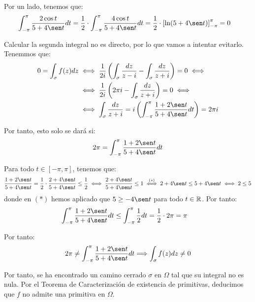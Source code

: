 \begin{ejercicio}
    Por un lado, tenemos que:
    \begin{align*}
        \int_{-\pi}^{\pi} \frac{2\cos t}{{5+4\sen t}}dt
        &= \dfrac{1}{2}\cdot \int_{-\pi}^{\pi} \frac{4\cos t}{{5+4\sen t}}dt
        = \dfrac{1}{2}\cdot \left[\ln(5+4\sen t)\right]_{-\pi}^{\pi}
        = 0
    \end{align*}

    Calcular la segunda integral no es directo, por lo que vamos a intentar evitarlo. Tenemmos que:
    \begin{align*}
        0 = \int_{\sigma} f(z)dz &\iff  \dfrac{1}{2i}\left(\int_{\sigma} \frac{dz}{z-i} - \int_{\sigma} \frac{dz}{z+i}\right) = 0\iff
        \\&\iff \dfrac{1}{2i}\left(2\pi i-\int_{\sigma} \frac{dz}{z+i}\right) = 0\iff
        \\&\iff \int_{\sigma} \frac{dz}{z+i} = i\left(\int_{-\pi}^{\pi} \frac{1+2\sen t}{{5+4\sen t}}dt\right) = 2\pi i
    \end{align*}

    Por tanto, esto solo se dará si:
    \begin{equation*}
        2\pi = \int_{-\pi}^{\pi} \frac{1+2\sen t}{{5+4\sen t}}dt
    \end{equation*}

    Para todo $t \in [-\pi,\pi]$, tenemos que:
    \begin{align*}
        \frac{1+2\sen t}{{5+4\sen t}}=\dfrac{1}{2}\cdot \frac{2+4\sen t}{{5+4\sen t}}\leq \dfrac{1}{2}
        \iff \frac{2+4\sen t}{{5+4\sen t}}\leq 1\stackrel{(\ast)}{\iff} 2+4\sen t\leq 5+4\sen t\iff 2\leq 5
    \end{align*}
    donde en $(\ast)$ hemos aplicado que $5\geq -4\sen t$ para todo $t \in \mathbb{R}$.
    Por tanto:
    \begin{align*}
        \int_{-\pi}^{\pi} \frac{1+2\sen t}{{5+4\sen t}}dt &\leq \int_{-\pi}^{\pi} \frac{1}{2}dt
        = \dfrac{1}{2}\cdot 2\pi = \pi
    \end{align*}

    Por tanto:
    \begin{align*}
        2\pi \neq \int_{-\pi}^{\pi} \frac{1+2\sen t}{{5+4\sen t}}dt
        \Longrightarrow
        \int_{\sigma} f(z)dz \neq 0
    \end{align*}

    Por tanto, se ha encontrado un camino cerrado $\sigma$ en $\Omega$ tal que su integral no es nula. Por el Teorema de Caracterización de existencia de primitivas, deducimos que $f$ no admite una primitiva en $\Omega$.
\end{ejercicio}


